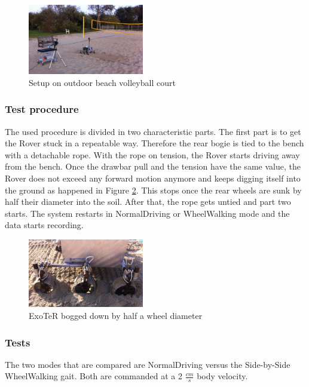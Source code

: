 \documentclass[a4paper,twocolumn]{esapub2005} %
\begin{document}

\begin{figure}[h!]
	\centering		\includegraphics[width=0.45\textwidth]{volley.JPG}	
	\caption{Setup on outdoor beach volleyball court}
	\label{fig:volley}
\end{figure}



\subsubsection{Test procedure}

The used procedure is divided in two characteristic parts. The first part is to get the Rover stuck in a repeatable way. Therefore the rear bogie is tied to the bench with a detachable rope. With the rope on tension, the Rover starts driving away from the bench. Once the drawbar pull and the tension have the same value, the Rover does not exceed any forward motion anymore and keeps digging itself into the ground as happened in Figure \ref{fig:volleyexoterdigg}. This stops once the rear wheels are sunk by half their diameter into the soil.
After that, the rope gets untied and part two starts. The system restarts in NormalDriving or WheelWalking mode and the data starts recording. 

\begin{figure}[h!]
	\centering		\includegraphics[width=0.45\textwidth]{volleyexoterdigg.JPG}	
	\caption{ExoTeR bogged down by half a wheel diameter}
	\label{fig:volleyexoterdigg}
\end{figure}


\subsubsection{Tests}
The two modes that are compared are NormalDriving versus the Side-by-Side WheelWalking gait. Both are commanded at a 2 $\frac{cm}{s}$ body velocity. 
\end{document}
